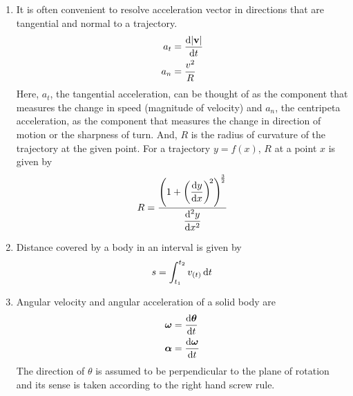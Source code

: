 \begin{enumerate}
\item It is often convenient to resolve acceleration vector in directions that are tangential and normal to a trajectory.
\begin{align}
a_t &= \frac{\mathop{}\!\mathrm{d} |\mathbf{v}|}{\mathop{}\!\mathrm{d} t} \label{eq6}\\
a_n &= \frac{v^2}{R} \label{eq7}
\end{align}
Here, $a_t$, the tangential acceleration, can be thought of as the component that measures the change in speed (magnitude of velocity) and $a_n$, the centripeta acceleration, as the component that measures the change in direction of motion or the sharpness of turn. \newline
And, $R$ is the radius of curvature of the trajectory at the given point. For a trajectory $y=f(x)$, $R$ at a point $x$ is given by 
\begin{equation} \label{eq8}
R=\frac{\displaystyle \left(1+\left(\frac{\mathop{}\!\mathrm{d} y}{\mathop{}\!\mathrm{d} x}\right)^{\!2}\right)^{\!\frac{3}{2}}}{\displaystyle \frac{\mathop{}\!\mathrm{d^2} y}{\mathop{}\!\mathrm{d} x^2}}
\end{equation}

\item Distance covered by a body in an interval is given by 
\begin{equation} \label{eq9}
s=\int_{t_1}^{t_2}v_{(t)}\mathop{}\!\mathrm{d} t
\end{equation}

\item Angular velocity and angular acceleration of a solid body are
\begin{align}
\bm{\omega} &= \frac{\mathop{}\!\mathrm{d} \bm{\theta}}{\mathop{}\!\mathrm{d} t} \label{eq10}\\
\bm{\alpha} &= \frac{\mathop{}\!\mathrm{d} \bm{\omega}}{\mathop{}\!\mathrm{d} t} \label{eq11}
\end{align}
The direction of $\theta$ is assumed to be perpendicular to the plane of rotation and its sense is taken according to the right hand screw rule.


\end{enumerate}
